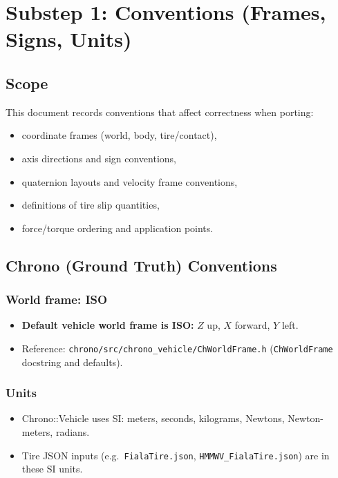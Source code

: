%
%
%
\section{Substep 1: Conventions (Frames, Signs, Units)}
\label{sec:substep1-conventions}

\subsection{Scope}
This document records conventions that affect correctness when porting:
\begin{itemize}
  \item coordinate frames (world, body, tire/contact),
  \item axis directions and sign conventions,
  \item quaternion layouts and velocity frame conventions,
  \item definitions of tire slip quantities,
  \item force/torque ordering and application points.
\end{itemize}

\subsection{Chrono (Ground Truth) Conventions}

\subsubsection{World frame: ISO}
\begin{itemize}
  \item \textbf{Default vehicle world frame is ISO:} $Z$ up, $X$ forward, $Y$ left.
  \item Reference: \texttt{chrono/src/chrono\_vehicle/ChWorldFrame.h} (\texttt{ChWorldFrame} docstring and defaults).
\end{itemize}

\subsubsection{Units}
\begin{itemize}
  \item Chrono::Vehicle uses SI: meters, seconds, kilograms, Newtons, Newton-meters, radians.
  \item Tire JSON inputs (e.g.\ \texttt{FialaTire.json}, \texttt{HMMWV\_FialaTire.json}) are in these SI units.
\end{itemize}

